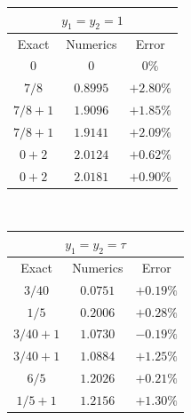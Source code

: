 \documentclass[aps,prb,reprint,superscriptaddress,amsfonts,amsmath,amssymb,showpacs,floatfix]{revtex4-1}
\begin{document}
\begin{table}
\begin{tabular}{|c|c|c|}
\hline
\multicolumn{3}{|c|}{$y_1=y_2=1$}\\
\hline\hline
Exact & Numerics & Error \\
\hline
$0$ & $0$ & $0\%$\\ %
$7/8$ & $0.8995$ & $+2.80\%$\\ %
$7/8+1$ & $1.9096$ & $+1.85\%$\\
$7/8+1$ & $1.9141$ & $+2.09\%$\\
$0+2$ & $2.0124$ & $+0.62\%$\\
$0+2$ & $2.0181$ & $+0.90\%$\\
\hline
\end{tabular}
~
\begin{tabular}{|c|c|c|}
\hline
\multicolumn{3}{|c|}{$y_1=y_2=\tau$}\\
\hline\hline
Exact & Numerics & Error \\
\hline
$3/40$ & $0.0751$ & $+0.19\%$\\ %
$1/5$  & $0.2006$ & $+0.28\%$\\ %
$3/40+1$ & $1.0730$ & $-0.19\%$\\
$3/40+1$ & $1.0884$ & $+1.25\%$\\
$6/5$   & $1.2026$ & $+0.21\%$\\ %
$1/5+1$ & $1.2156$ & $+1.30\%$\\
\hline
\end{tabular}

~

~


\end{table}
\end{document}

